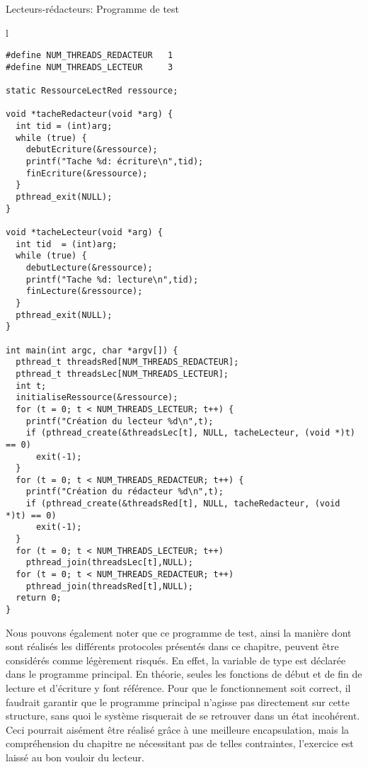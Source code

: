 \begin{algorithm}[h!tp]
\caption{Lecteurs-rédacteurs: Programme de test}\label{lectredtest}
\begin{center}
\begin{tabular}{l}
\lstset{language=C++}
\begin{lstlisting}
#define NUM_THREADS_REDACTEUR   1
#define NUM_THREADS_LECTEUR     3

static RessourceLectRed ressource;

void *tacheRedacteur(void *arg) {
  int tid = (int)arg;
  while (true) {
    debutEcriture(&ressource);
    printf("Tache %d: écriture\n",tid);
    finEcriture(&ressource);
  }
  pthread_exit(NULL);
}

void *tacheLecteur(void *arg) {
  int tid  = (int)arg;
  while (true) {
    debutLecture(&ressource);
    printf("Tache %d: lecture\n",tid);
    finLecture(&ressource);
  }
  pthread_exit(NULL);
}

int main(int argc, char *argv[]) {
  pthread_t threadsRed[NUM_THREADS_REDACTEUR];
  pthread_t threadsLec[NUM_THREADS_LECTEUR];
  int t;
  initialiseRessource(&ressource);
  for (t = 0; t < NUM_THREADS_LECTEUR; t++) {
    printf("Création du lecteur %d\n",t);
    if (pthread_create(&threadsLec[t], NULL, tacheLecteur, (void *)t) == 0)
      exit(-1);
  }
  for (t = 0; t < NUM_THREADS_REDACTEUR; t++) {
    printf("Création du rédacteur %d\n",t);
    if (pthread_create(&threadsRed[t], NULL, tacheRedacteur, (void *)t) == 0)
      exit(-1);
  }
  for (t = 0; t < NUM_THREADS_LECTEUR; t++)
    pthread_join(threadsLec[t],NULL);
  for (t = 0; t < NUM_THREADS_REDACTEUR; t++)
    pthread_join(threadsRed[t],NULL);
  return 0;
}
\end{lstlisting}
\end{tabular}
\end{center}
\end{algorithm}

Nous pouvons également noter que ce programme de test, ainsi la manière dont sont réalisés les différents protocoles présentés dans ce chapitre, peuvent être considérés comme légèrement risqués. En effet, la variable de type  est déclarée dans le programme principal. En théorie, seules les fonctions de début et de fin de lecture et d'écriture y font référence. Pour que le fonctionnement soit correct, il faudrait garantir que le programme principal n'agisse pas directement sur cette structure, sans quoi le système risquerait de se retrouver dans un état incohérent. Ceci pourrait aisément être réalisé grâce à une meilleure encapsulation, mais la compréhension du chapitre ne nécessitant pas de telles contraintes, l'exercice est laissé au bon vouloir du lecteur.

